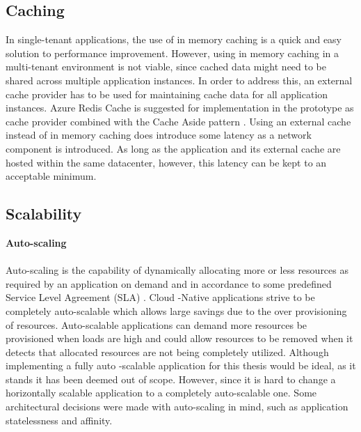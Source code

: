 \subsection{Caching}

In single-tenant applications, the use of in memory caching is a quick and easy solution to performance improvement. However, using in memory caching in a multi-tenant environment is not viable, since cached data might need to be shared across multiple application instances. In order to address this, an external cache provider has to be used for maintaining cache data for all application instances. Azure Redis Cache  is suggested for implementation in the prototype  as cache provider combined with the Cache Aside pattern \cite{Homer2014}. Using an external cache instead of in memory caching does introduce some latency as a network component is introduced. As long as the application and its external cache are hosted within the same datacenter, however, this latency can be kept to an acceptable minimum.


\subsection{Scalability}
\label{sec:scalability}

\textbf{Auto-scaling}
\\
\\
Auto-scaling is the capability of dynamically allocating more or less resources as required by an application on demand and in accordance to some predefined Service Level Agreement (SLA) \cite{Homer2014}. Cloud -Native applications strive to be completely auto-scalable which allows large savings due to the over provisioning of resources. Auto-scalable applications can demand more resources be provisioned when loads are high and could allow resources to be removed when it detects that allocated resources are not being completely utilized. Although implementing a fully auto -scalable application for this thesis would be ideal, as it stands it has been deemed out of scope. However, since it is hard to change a horizontally scalable application to a completely auto-scalable one. Some architectural decisions were made with auto-scaling in mind, such as application statelessness and affinity.

